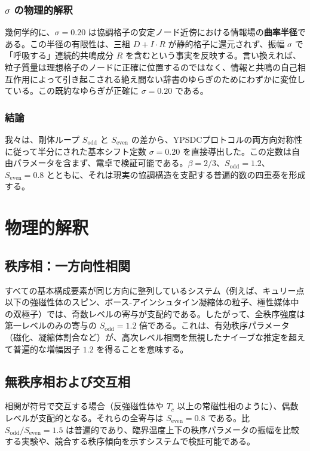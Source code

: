 \documentclass[11pt,a4paper]{article}
\begin{document}
	\subsubsection{\(\sigma\) の物理的解釈}
	
	幾何学的に、\(\sigma = 0.20\) は協調格子の安定ノード近傍における情報場の\textbf{曲率半径}である。この半径の有限性は、三組 \(D+I\cdot R\) が静的格子に還元されず、振幅 \(\sigma\) で「呼吸する」連続的共鳴成分 \(R\) を含むという事実を反映する。言い換えれば、粒子質量は理想格子のノードに正確に位置するのではなく、情報と共鳴の自己相互作用によって引き起こされる絶え間ない辞書のゆらぎのためにわずかに変位している。この既約なゆらぎが正確に \(\sigma = 0.20\) である。
	
	\subsubsection{結論}
	
	我々は、剛体ループ \(S_{\mathrm{odd}}\) と \(S_{\mathrm{even}}\) の差から、YPSDCプロトコルの両方向対称性に従って半分にされた基本シフト定数 \(\sigma = 0.20\) を直接導出した。この定数は自由パラメータを含まず、電卓で検証可能である。\(\beta = 2/3\)、\(S_{\mathrm{odd}} = 1.2\)、\(S_{\mathrm{even}} = 0.8\) とともに、それは現実の協調構造を支配する普遍的数の四重奏を形成する。
	
	\section{物理的解釈}
	
	\subsection{秩序相：一方向性相関}
	すべての基本構成要素が同じ方向に整列しているシステム（例えば、キュリー点以下の強磁性体のスピン、ボース-アインシュタイン凝縮体の粒子、極性媒体中の双極子）では、奇数レベルの寄与が支配的である。したがって、全秩序強度は第一レベルのみの寄与の \(S_{\text{odd}} = 1.2\) 倍である。これは、有効秩序パラメータ（磁化、凝縮体割合など）が、高次レベル相関を無視したナイーブな推定を超えて普遍的な増幅因子 \(1.2\) を得ることを意味する。
	
	\subsection{無秩序相および交互相}
	相関が符号で交互する場合（反強磁性体や \(T_c\) 以上の常磁性相のように）、偶数レベルが支配的となる。それらの全寄与は \(S_{\text{even}} = 0.8\) である。比 \(S_{\text{odd}}/S_{\text{even}} = 1.5\) は普遍的であり、臨界温度上下の秩序パラメータの振幅を比較する実験や、競合する秩序傾向を示すシステムで検証可能である。
	
\end{document}
